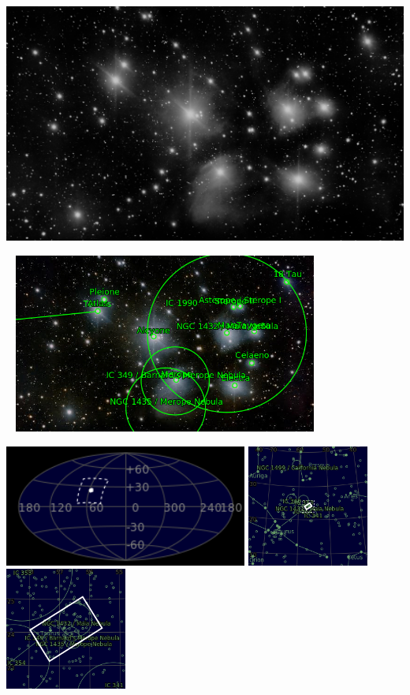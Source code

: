 \includegraphics[width=\textwidth]{../Imaging//Grayscale/Pleiades_Cluster.jpg}
\begin{center}
 \ \newpage
\includegraphics[width=0.75\textwidth]{../Imaging//Annotated/Pleiades_Cluster_Annotated.jpg}

\includegraphics[height=4cm]{../Imaging//Annotated/Pleiades_Cluster_Globe.jpg}
\includegraphics[height=4cm]{../Imaging//Annotated/Pleiades_Cluster_Close.jpg}
\includegraphics[height=4cm]{../Imaging//Annotated/Pleiades_Cluster_Closer.jpg}
\end{center}
